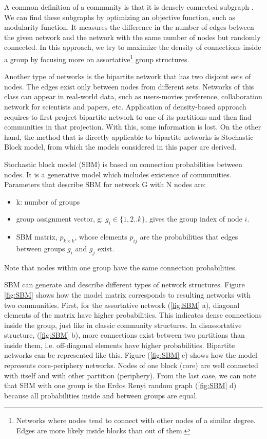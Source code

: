 A common definition of a community is that it is densely connected subgraph \cite{userguide}. We can find these subgraphs by optimizing an objective function, such as modularity function. It measures the difference in the number of edges between the given network and the network with the same number of nodes but randomly connected. In this approach, we try to maximize the density of connections inside a group by focusing more on assortative\footnote{Networks where nodes tend to connect with other nodes of a similar degree. Edges are more likely inside blocks than out of them.} group structures. 

Another type of networks is the bipartite network that has two disjoint sets of nodes. The edges exist only between nodes from different sets. Networks of this class can appear in real-world data, such as users-movies preference, collaboration network for scientists and papers, etc. Application of density-based approach requires to first project bipartite network to one of its partitions and then find communities in that projection. With this, some information is lost. On the other hand, the method that is directly applicable to bipartite networks is Stochastic Block model, from which the models considered in this paper are derived.

Stochastic block model (SBM) is based on connection probabilities between nodes. It is a generative model which includes existence of communities. Parameters that describe SBM for network G with N nodes are:
\begin{itemize}
	\item k: number of groups
	\item group assignment vector, g: $g_i \in\{1,2..k\}$, gives the group index of node $i$.
	\item SBM matrix, $p_{k \times k}$, whose elements $p_{ij}$ are the probabilities that edges between groups $g_i$ and $g_j$ exist.
\end{itemize}
Note that nodes within one group have the same connection probabilities.

SBM can generate and describe different types of network structures. Figure \ref{fig:SBM} \cite{userguide} shows how the model matrix corresponds to resulting networks with two communities. First, for the assortative network (\ref{fig:SBM} a), diagonal elements of the matrix have higher probabilities. This indicates dense connections inside the group, just like in classic community structures. In disassortative structure, (\ref{fig:SBM} b), more connections exist between two partitions than inside them, i.e. off-diagonal elements have higher probabilities. Bipartite networks can be represented like this. 
Figure (\ref{fig:SBM} c) shows how the model represents core-periphery networks. Nodes of one block (core) are well connected with itself and with other partition (periphery). From the last case, we can note that SBM with one group is the Erdos Renyi random graph (\ref{fig:SBM} d) because all probabilities inside and between groups are equal.

